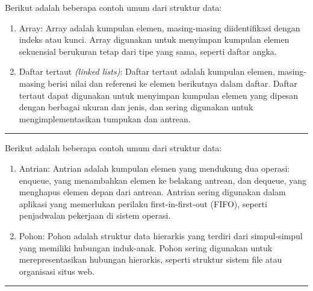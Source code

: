 \documentclass[12pt,preprintnumbers,amsmath,amssymb,nofootinbib,superscriptaddress]{revtex4-1}
\begin{document}
\vspace{2cm}
Berikut adalah beberapa contoh umum dari struktur data:
\begin{enumerate}
    \item Array: Array adalah kumpulan elemen, masing-masing diidentifikasi dengan indeks atau kunci. Array digunakan untuk menyimpan kumpulan elemen sekuensial berukuran tetap dari tipe yang sama, seperti daftar angka.
    \item Daftar tertaut \textit{(linked lists)}: Daftar tertaut adalah kumpulan elemen, masing-masing berisi nilai dan referensi ke elemen berikutnya dalam daftar. Daftar tertaut dapat digunakan untuk menyimpan kumpulan elemen yang dipesan dengan berbagai ukuran dan jenis, dan sering digunakan untuk mengimplementasikan tumpukan dan antrean.
\end{enumerate}

\vspace{1cm}

\newpage

\label{Ueff}
\vspace{-0.7cm}
\vspace{-0.2cm}\hrule

\vspace{2cm}
Berikut adalah beberapa contoh umum dari struktur data:
\begin{enumerate}
    \item Antrian: Antrian adalah kumpulan elemen yang mendukung dua operasi: enqueue, yang menambahkan elemen ke belakang antrean, dan dequeue, yang menghapus elemen depan dari antrean. Antrian sering digunakan dalam aplikasi yang memerlukan perilaku first-in-first-out (FIFO), seperti penjadwalan pekerjaan di sistem operasi.
    \item Pohon: Pohon adalah struktur data hierarkis yang terdiri dari simpul-simpul yang memiliki hubungan induk-anak. Pohon sering digunakan untuk merepresentasikan hubungan hierarkis, seperti struktur sistem file atau organisasi situs web.
\end{enumerate}

\vspace{1cm}

\newpage

\label{Ueff}
\vspace{-0.7cm}
\vspace{-0.2cm}\hrule
\end{document}
